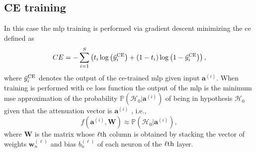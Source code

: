 \documentclass[draftcls,onecolumn,12pt]{IEEEtran}
\begin{document}
\subsection{CE training \label{sec: ce_train}}
In this case the \ac{mlp} training is performed via gradient descent minimizing the \ac{ce} defined as
\begin{equation}\label{eq:ce}
CE = -\sum_{i=1}^{S}\left(t_i\log\left(\tilde{y}_i^{\rm CE}\right)+\left(1-t_i\right)\log\left(1-\tilde{y}_i^{\rm CE}\right) \right),
\end{equation}
where $\tilde{y}_i^{\rm CE}$ denotes the output of the \ac{ce}-trained \ac {mlp} given input $\bm{a}^{(i)}$. When training is performed with \ac{ce} loss function the output of the \ac{mlp} is the minimum \ac{mse} approximation of the probability $\mathbb{P}(\mathcal{H}_0|\bm{a}^{(i)})$ of being in hypothesis $\mathcal{H}_0$ given that the attenuation vector is $\bm{a}^{(i)}$ \cite{Bishop2006}, i.e.,
\begin{equation}
    f(\bm{a}^{(i)},\bm{W}) \approx \mathbb{P}(\mathcal{H}_0|\bm{a}^{(i)}),
\end{equation} 
where $\bm{W}$ is the matrix whose $\ell{\rm th}$ column is obtained by stacking the vector of weights $\bm{w}_n^{(\ell)}$ and bias $b_n^{(\ell)}$ of each neuron of the $\ell{\rm th}$ layer.
\end{document}
